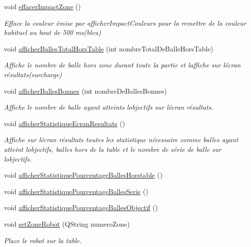\begin{DoxyCompactItemize}
void \hyperlink{class_ttpa_ihm_abe9973c64673cdaa067617f9246781d2}{effacer\+Impact\+Zone} ()
\begin{DoxyCompactList}\small\item\em Efface la couleur émise par afficher\+Impact\+Couleurs pour la remettre de la couleur habituel au bout de 500 ms(bleu) \end{DoxyCompactList}\item 
void \hyperlink{class_ttpa_ihm_a6102875b095d99c147e6a71a0dfbfb28}{afficher\+Balles\+Total\+Hors\+Table} (int nombre\+Total\+De\+Balle\+Hors\+Table)
\begin{DoxyCompactList}\small\item\em Affiche le nombre de balle hors zone durant toute la partie et l\textquotesingle{}affiche sur l\textquotesingle{}écran résultats(surcharge) \end{DoxyCompactList}\item 
void \hyperlink{class_ttpa_ihm_a92494cbd992da35c40128408fb06e9a1}{afficher\+Balles\+Bonnes} (int nombre\+De\+Balles\+Bonnes)
\begin{DoxyCompactList}\small\item\em Affiche le nombre de balle ayant atteints l\textquotesingle{}objectifs sur l\textquotesingle{}écran résultats. \end{DoxyCompactList}\item 
void \hyperlink{class_ttpa_ihm_aa480a02532144d0f99af027b5b201ae1}{afficher\+Statistique\+Ecran\+Resultats} ()
\begin{DoxyCompactList}\small\item\em Affiche sur l\textquotesingle{}écran résultats toutes les statistique nécessaire comme balles ayant atteint l\textquotesingle{}objectifs, balles hors de la table et le nombre de série de balle sur l\textquotesingle{}objectifs. \end{DoxyCompactList}\item 
void \hyperlink{class_ttpa_ihm_a58058063eb377b4c4c48048e4bf84e77}{afficher\+Statistique\+Pourcentage\+Balles\+Horstable} ()
\item 
void \hyperlink{class_ttpa_ihm_aec988dc2398578eb8e91563d1ba58cde}{afficher\+Statistique\+Pourcentage\+Balles\+Serie} ()
\item 
void \hyperlink{class_ttpa_ihm_ac37d57d13301cda22f062219de8731c4}{afficher\+Statistique\+Pourcentage\+Balles\+Objectif} ()
\item 
void \hyperlink{class_ttpa_ihm_abda1a93ec09ec404b129e08876faa5f8}{set\+Zone\+Robot} (Q\+String numero\+Zone)
\begin{DoxyCompactList}\small\item\em Place le robot sur la table. \end{DoxyCompactList}\item 

\end{DoxyCompactItemize}
